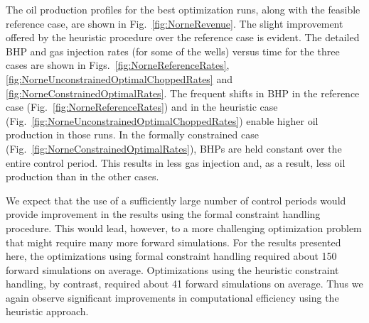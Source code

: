 \documentclass[twocolumn,numbook]{svjour3}          %
\begin{document}
The oil production profiles for the best optimization runs, along with the
feasible reference case, are shown in Fig.~\ref{fig:NorneRevenue}. The slight
improvement offered by the heuristic procedure over the reference case is
evident. The detailed BHP and gas injection rates (for some of the wells) versus time for the three
cases are shown in Figs.~\ref{fig:NorneReferenceRates},
\ref{fig:NorneUnconstrainedOptimalChoppedRates} and
\ref{fig:NorneConstrainedOptimalRates}. The frequent shifts in BHP in the
reference case (Fig.~\ref{fig:NorneReferenceRates}) and in the heuristic
case (Fig.~\ref{fig:NorneUnconstrainedOptimalChoppedRates}) enable higher
oil production in those runs. In the formally constrained case
(Fig.~\ref{fig:NorneConstrainedOptimalRates}), BHPs are held constant over
the entire control period. This results in less gas injection and, as a
result, less oil production than in the other cases.


We expect that the use of a sufficiently large number of control periods would
provide improvement in the results using the formal constraint handling
procedure. This would lead, however, to a more challenging optimization problem
that might require many more forward simulations. For the results presented
here, the optimizations using formal constraint handling required about 150
forward simulations on average. Optimizations using the heuristic constraint
handling, by contrast, required about 41 forward simulations on average. Thus we
again observe significant improvements in computational efficiency using the
heuristic approach.
\end{document}
